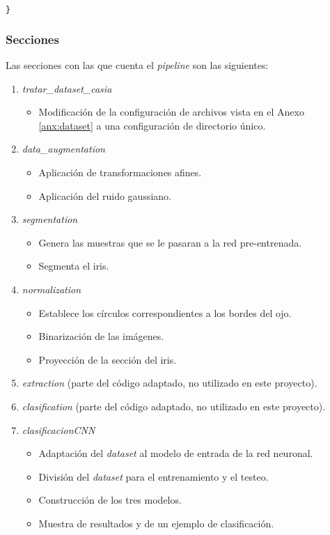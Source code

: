 {\begin{lstlisting}[language=Python]
}
\end{lstlisting}

\subsubsection{Secciones}

Las secciones con las que cuenta el \textit{pipeline} son las siguientes:

\begin{enumerate}
    \item \textit{tratar\_dataset\_casia}
    \begin{itemize}
        \item Modificación de la configuración de archivos vista en el Anexo \ref{anx:dataset} a una configuración de directorio único.
    \end{itemize}
    \item \textit{data\_augmentation}
    \begin{itemize}
        \item Aplicación de transformaciones afines.
        \item Aplicación del ruido gaussiano.
    \end{itemize}
    \item \textit{segmentation}
    \begin{itemize}
        \item Genera las muestras que se le pasaran a la red pre-entrenada.
        \item Segmenta el iris.
    \end{itemize}
    \item \textit{normalization}
    \begin{itemize}
        \item Establece los círculos correspondientes a los bordes del ojo.
        \item Binarización de las imágenes.
        \item Proyección de la sección del iris.
    \end{itemize}
    \item \textit{extraction} (parte del código adaptado, no utilizado en este proyecto).
    \item \textit{clasification} (parte del código adaptado, no utilizado en este proyecto).
    \item \textit{clasificacionCNN}
    \begin{itemize}
        \item Adaptación del \textit{dataset} al modelo de entrada de la red neuronal.
        \item División del \textit{dataset} para el entrenamiento y el testeo.
        \item Construcción de los tres modelos.
        \item Muestra de resultados y de un ejemplo de clasificación.
    \end{itemize}
\end{enumerate}


}
